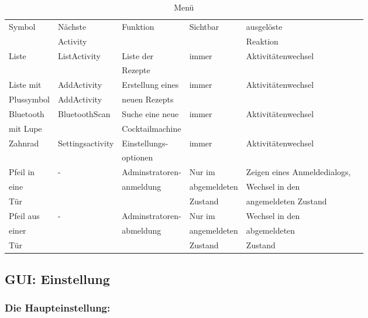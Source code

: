 \begin{table}
	\centering
	\caption{Menü}
	\label{table:menu}
	
	\begin{tabular}{|l|l|l|l|l|l|}
		\hline
		Symbol  & Nächste   & Funktion  & Sichtbar  & ausgelöste  \\
		&  Activity  &   &   &  Reaktion \\ \hline
		Liste  & ListActivity  & Liste der    & immer  & Aktivitätenwechsel \\ 
		&    &   Rezepte  &    &   \\ \hline
		Liste mit   & AddActivity  & Erstellung eines  & immer  & Aktivitätenwechsel \\ 
		Plussymbol  & AddActivity  &  neuen Rezepts  &   &  \\ \hline
		Bluetooth   & BluetoothScan  & Suche eine neue   & immer  & Aktivitätenwechsel \\
		mit Lupe  &   &  Cocktailmachine  &    &   \\ \hline
		Zahnrad  & Settingsactivity  & Einstellungs-  & immer  & Aktivitätenwechsel \\   &    & optionen   &    &   \\ \hline
		Pfeil in   & -  & Adminstratoren-  & Nur im   & Zeigen eines Anmeldedialogs, \\
		eine   &  &anmeldung   & abgemeldeten   & Wechsel in den  \\ 
		Tür   &  &    &  Zustand  & angemeldeten Zustand \\ \hline
		Pfeil aus   & -  & Adminstratoren-  & Nur im  & Wechsel in den \\  
		einer   &   &abmeldung    &  angemeldeten   & abgemeldeten  \\
		Tür  &   &    &   Zustand  &  Zustand \\ \hline
	\end{tabular}
	
\end{table}


\subsection{GUI: Einstellung}

\subsubsection{Die Haupteinstellung:}

